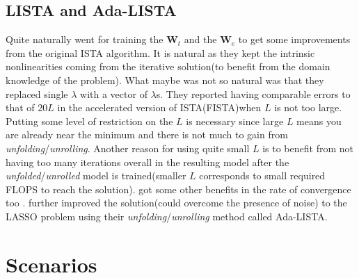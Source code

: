 \subsection{LISTA and Ada-LISTA}

Quite naturally \cite{Gregor2010} went for training the $\boldsymbol{W}_t$ and the $\boldsymbol{W}_e$ to get some improvements 
from the original \ac{ISTA}\cite{Daubechies2003} algorithm. It is natural as they kept the intrinsic 
nonlinearities coming from the iterative solution(to benefit from the domain knowledge of the problem). 
What maybe was not so natural was that they replaced single $\lambda$ with a vector of $\lambda$s. They reported having 
comparable errors to that of $20L$ in the accelerated version of 
\ac{ISTA}\cite{Daubechies2003}(\ac{FISTA}\cite{Beck2009})when $L$ is not too 
large. Putting some level of restriction on the $L$ is necessary since large $L$ means you are already near the minimum 
and there is not much to gain from \emph{unfolding}/\emph{unrolling}. Another reason for using quite small $L$ is to benefit 
from not having too many iterations overall in the resulting model after the \emph{unfolded}/\emph{unrolled} model is 
trained(smaller $L$ corresponds to small required \ac{FLOPS}\cite{Hager2010}\cite{Hennessy2019} to reach the solution). 
\cite{Gregor2010} got some other benefits in the rate of convergence too 
\cite{Daubechies2003}\cite{Beck2009}\cite{Gregor2010}. \cite{Aberdam2020} further improved the solution(could overcome 
the presence of noise) to the \ac{LASSO}\cite{Hastie2009} problem using their 
\emph{unfolding}/\emph{unrolling} method called \ac{Ada-LISTA}.  


\section{Scenarios}

